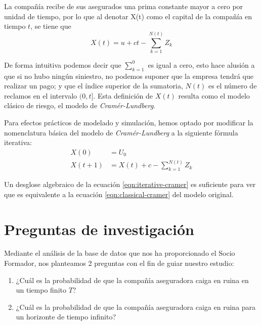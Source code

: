 \documentclass[journal]{IEEEtran}
\begin{document}
            La compañía recibe de sus asegurados una prima constante mayor a cero por unidad de tiempo, por lo que al denotar X(t) como el capital de la compañía en tiempo $t$, se tiene que
            \begin{equation}\label{eqn:classical-cramer}
                X(t) = u + ct -\sum_{k=1}^{N(t)}Z_k
            \end{equation}

            De forma intuitiva podemos decir que $\sum_{k=1}^{0}$ es igual a cero, esto hace alusión a que si no hubo ningún siniestro, no podemos suponer que la empresa tendrá que realizar un pago; y que el índice superior de la sumatoria, $N(t)$ es el número de reclamos en el intervalo $(0,t]$. Esta definición de $X(t)$ resulta como el modelo clásico de riesgo, el modelo de \emph{Cramér-Lundberg}.

            Para efectos prácticos de modelado y simulación, hemos optado por modificar la nomenclatura básica del modelo de \emph{Cramér-Lundberg} a la siguiente fórmula iterativa:
            \begin{equation}\label{eqn:iterative-cramer}
                \begin{aligned}
                    X(0) &= U_0 \\
                    X(t+1) &= X(t) + c -\sum_{k=1}^{N(t)}Z_k
                \end{aligned}
            \end{equation}

            Un desglose algebraico de la ecuación \ref{eqn:iterative-cramer} es suficiente para ver que es equivalente a la ecuación \ref{eqn:classical-cramer} del modelo original.
            
    \section{Preguntas de investigación} \label{sec:research-questions}

        Mediante el análisis de la base de datos que nos ha proporcionado el Socio Formador, nos planteamos 2 preguntas con el fin de guiar nuestro estudio:
    
        \begin{enumerate}
            \item ¿Cuál es la probabilidad de que la compañía aseguradora caiga en ruina en un tiempo finito $T$?
            \item ¿Cuál es la probabilidad de que la compañía aseguradora caiga en ruina para un horizonte de tiempo infinito?
        \end{enumerate}
        
\end{document}
